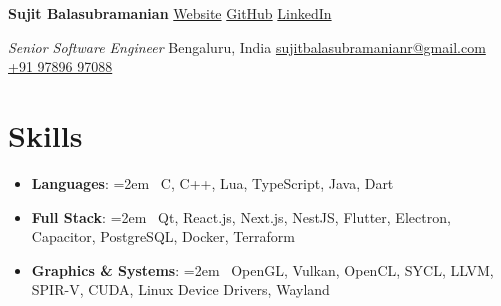 \documentclass[11pt]{article}
\newcommand{\resumeItem}[2]{%
\item\small
  \textbf{#1}:%
  \hangindent=2em
  \hangafter=1
  \ #2\vspace{-2pt}
}
\begin{document}
\noindent
\textbf{\Large Sujit Balasubramanian}
\hfill
\faGlobe \href{https://sujitbalasubramanian.in}{Website} \textbar{}
\faGithub \href{https://github.com/sujitbalasubramanian}{GitHub} \textbar{}
\faLinkedin \href{https://www.linkedin.com/in/sujit-balasubramanian}{LinkedIn}

\noindent
\textit{Senior Software Engineer} \textbar{} Bengaluru, India
\hfill
\href{mailto:sujitbalasubramanianr@gmail.com}{sujitbalasubramanianr@gmail.com}
\textbar{} \href{tel:+919789697088}{+91 97896 97088}

\section*{Skills}
\begin{itemize}
    \resumeItem{Languages}{C, C++, Lua, TypeScript, Java, Dart}
    \resumeItem{Full Stack}{Qt, React.js, Next.js, NestJS, Flutter,
    Electron, Capacitor, PostgreSQL, Docker, Terraform}
    \resumeItem{Graphics \& Systems}{OpenGL, Vulkan, OpenCL, SYCL,
    LLVM, SPIR-V, CUDA, Linux Device Drivers, Wayland}
\end{itemize}
\end{document}
